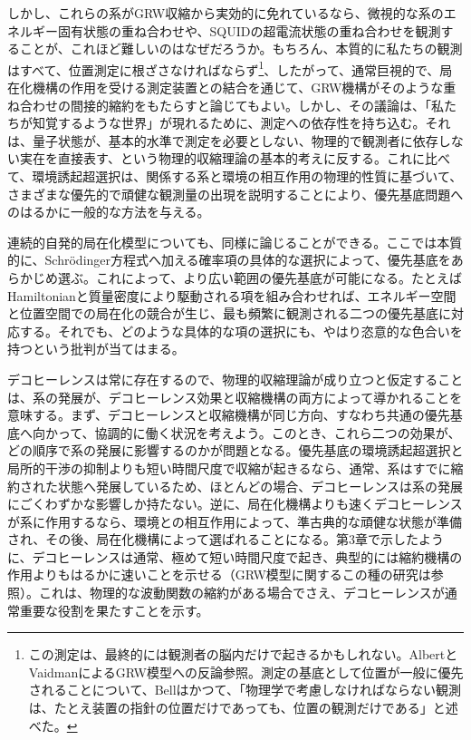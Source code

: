 しかし、これらの系がGRW収縮から実効的に免れているなら、微視的な系のエネルギー固有状態の重ね合わせや、SQUIDの超電流状態の重ね合わせを観測することが、これほど難しいのはなぜだろうか。もちろん、本質的に私たちの観測はすべて、位置測定に根ざさなければならず\footnote{この測定は、最終的には観測者の脳内だけで起きるかもしれない。AlbertとVaidman\cite{ref466}によるGRW模型への反論参照。測定の基底として位置が一般に優先されることについて、Bell\cite{ref412}はかつて、「物理学で考慮しなければならない観測は、たとえ装置の指針の位置だけであっても、位置の観測だけである」と述べた。}、したがって、通常巨視的で、局在化機構の作用を受ける測定装置との結合を通じて、GRW機構がそのような重ね合わせの間接的縮約をもたらすと論じてもよい。しかし、その議論は、「私たちが知覚するような世界」が現れるために、測定への依存性を持ち込む。それは、量子状態が、基本的水準で測定を必要としない、物理的で観測者に依存しない実在を直接表す、という物理的収縮理論の基本的考えに反する。これに比べて、環境誘起超選択は、関係する系と環境の相互作用の物理的性質に基づいて、さまざまな優先的で頑健な観測量の出現を説明することにより、優先基底問題へのはるかに一般的な方法を与える。

連続的自発的局在化模型についても、同様に論じることができる。ここでは本質的に、Schrödinger方程式へ加える確率項の具体的な選択によって、優先基底をあらかじめ選ぶ。これによって、より広い範囲の優先基底が可能になる。たとえばHamiltonianと質量密度により駆動される項を組み合わせれば、エネルギー空間と位置空間での局在化の競合が生じ、最も頻繁に観測される二つの優先基底に対応する。それでも、どのような具体的な項の選択にも、やはり恣意的な色合いを持つという批判が当てはまる。


\hypertarget{srcpage:351}{}\label{srcpage:351}
デコヒーレンスは常に存在するので、物理的収縮理論が成り立つと仮定することは、系の発展が、デコヒーレンス効果と収縮機構の両方によって導かれることを意味する。まず、デコヒーレンスと収縮機構が同じ方向、すなわち共通の優先基底へ向かって、協調的に働く状況を考えよう。このとき、これら二つの効果が、どの順序で系の発展に影響するのかが問題となる\cite{ref391}。優先基底の環境誘起超選択と局所的干渉の抑制よりも短い時間尺度で収縮が起きるなら、通常、系はすでに縮約された状態へ発展しているため、ほとんどの場合、デコヒーレンスは系の発展にごくわずかな影響しか持たない。逆に、局在化機構よりも速くデコヒーレンスが系に作用するなら、環境との相互作用によって、準古典的な頑健な状態が準備され、その後、局在化機構によって選ばれることになる。第3章で示したように、デコヒーレンスは通常、極めて短い時間尺度で起き、典型的には縮約機構の作用よりもはるかに速いことを示せる（GRW模型に関するこの種の研究は\cite{ref166,ref467}参照）。これは、物理的な波動関数の縮約がある場合でさえ、デコヒーレンスが通常重要な役割を果たすことを示す。

